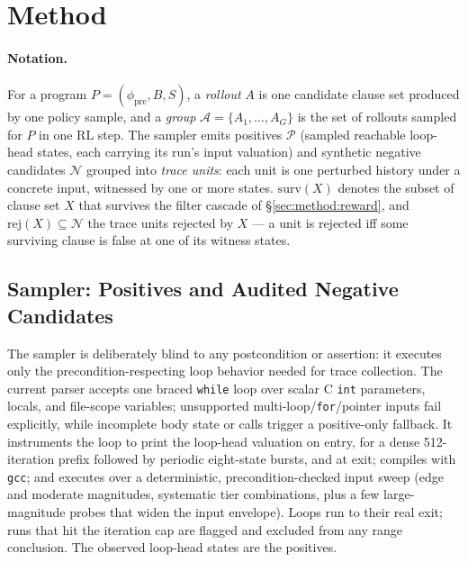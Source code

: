 \section{Method}\label{sec:method}

\paragraph{Notation.}
For a program $P = (\phi_{\mathrm{pre}}, B, S)$, a \emph{rollout} $A$ is one candidate clause set produced by one policy sample, and a \emph{group} $\mathcal{A} = \{A_1, \dots, A_G\}$ is the set of rollouts sampled for $P$ in one RL step.
The sampler emits positives $\mathcal{P}$ (sampled reachable loop-head states, each carrying its run's input valuation) and synthetic negative candidates $\mathcal{N}$ grouped into \emph{trace units}: each unit is one perturbed history under a concrete input, witnessed by one or more states.
$\mathrm{surv}(X)$ denotes the subset of clause set $X$ that survives the filter cascade of \S\ref{sec:method:reward}, and $\mathrm{rej}(X) \subseteq \mathcal{N}$ the trace units rejected by $X$ --- a unit is rejected iff some surviving clause is false at one of its witness states.

\subsection{Sampler: Positives and Audited Negative Candidates}
\label{sec:method:sampler}

The sampler is deliberately blind to any postcondition or assertion: it executes only the precondition-respecting loop behavior needed for trace collection.
The current parser accepts one braced \texttt{while} loop over scalar C \texttt{int} parameters, locals, and file-scope variables; unsupported multi-loop/\texttt{for}/pointer inputs fail explicitly, while incomplete body state or calls trigger a positive-only fallback.
It instruments the loop to print the loop-head valuation on entry, for a dense 512-iteration prefix followed by periodic eight-state bursts, and at exit; compiles with \texttt{gcc}; and executes over a deterministic, precondition-checked input sweep (edge and moderate magnitudes, systematic tier combinations, plus a few large-magnitude probes that widen the input envelope).
Loops run to their real exit; runs that hit the iteration cap are flagged and excluded from any range conclusion.
The observed loop-head states are the positives.

